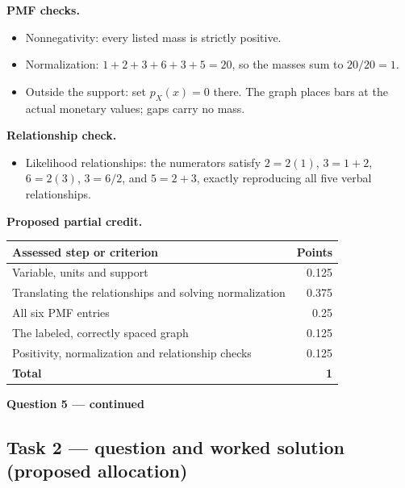 \textbf{PMF checks.}
\begin{itemize}
\item Nonnegativity: every listed mass is strictly positive.
\item Normalization: $1+2+3+6+3+5=20$, so the masses sum to $20/20=1$.
\item Outside the support: set $p_X(x)=0$ there. The graph places bars at the actual monetary values; gaps carry no mass.
\end{itemize}

\textbf{Relationship check.}
\begin{itemize}
\item Likelihood relationships: the numerators satisfy $2=2(1)$, $3=1+2$, $6=2(3)$, $3=6/2$, and $5=2+3$, exactly reproducing all five verbal relationships.
\end{itemize}

\par\smallskip
\noindent\begin{minipage}{\linewidth}
\textbf{Proposed partial credit.}\par\smallskip
\begin{tabularx}{\linewidth}{@{}>{\raggedright\arraybackslash}X r@{}}\toprule
\textbf{Assessed step or criterion} & \textbf{Points}\\\midrule
Variable, units and support & 0.125\\
Translating the relationships and solving normalization & 0.375\\
All six PMF entries & 0.25\\
The labeled, correctly spaced graph & 0.125\\
Positivity, normalization and relationship checks & 0.125\\
\midrule
\textbf{Total} & \textbf{1}\\
\bottomrule\end{tabularx}
\end{minipage}\par\smallskip

\par\vspace{3mm}\secInicio[][sec:q5]

\clearpage
\textbf{Question 5 --- continued}

\subsection*{Task 2 --- question and worked solution (proposed allocation) }
\label{sol:q5t2}

